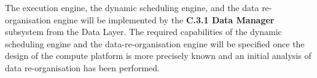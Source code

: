 \documentclass[11pt,a4paper]{article}
\begin{document}
The execution engine, the dynamic scheduling engine, and the data
re-organisation engine will be implemented by the {\bf C.3.1 Data
  Manager} subsystem from the Data Layer. The required capabilities of
the dynamic scheduling engine and the data-re-organisation engine will
be specified once the design of the compute platform is more precisely
known and an initial analysis of data re-organisation has been
performed.

\clearpage
{}
%
\end{document}
